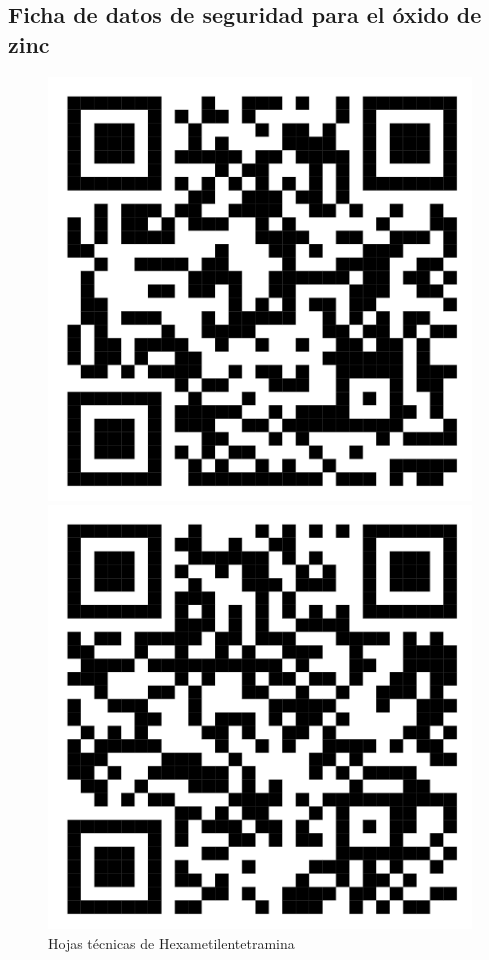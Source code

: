 \documentclass[12pt]{article}
\begin{document}
\subsection*{Ficha de datos de seguridad para el óxido de zinc}
 \begin{figure}[htbp]
  \begin{minipage}{0.4\textwidth}
    \centering
    \includegraphics[width=\linewidth]{Imagenes/Hexametilentetramina.png}
    \caption{Hojas técnicas de Hexametilentetramina}
    \label{fig:imagen3}
  \end{minipage}\hfill  
  \begin{minipage}{0.4\textwidth}
    \centering
        \includegraphics[width=\linewidth]{Imagenes/Zinc Acetato.png}

\end{minipage}
\end{figure}
\end{document}
